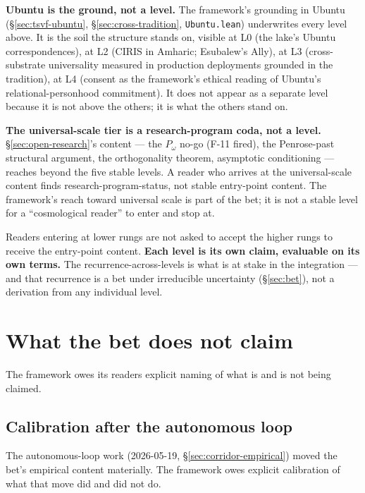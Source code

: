 \documentclass[11pt,a4paper]{article}
\newcommand{\Pomega}{P_{\omega}}
\begin{document}
\textbf{Ubuntu is the ground, not a level.} The framework's grounding in Ubuntu (\S\ref{sec:tsvf-ubuntu}, \S\ref{sec:cross-tradition}, \texttt{Ubuntu.lean}) underwrites every level above. It is the soil the structure stands on, visible at L0 (the lake's Ubuntu correspondences), at L2 (CIRIS in Amharic; Esubalew's Ally), at L3 (cross-substrate universality measured in production deployments grounded in the tradition), at L4 (consent as the framework's ethical reading of Ubuntu's relational-personhood commitment). It does not appear as a separate level because it is not above the others; it is what the others stand on.

\textbf{The universal-scale tier is a research-program coda, not a level.} \S\ref{sec:open-research}'s content --- the $\Pomega$ no-go (F-11 fired), the Penrose-past structural argument, the orthogonality theorem, asymptotic conditioning --- reaches beyond the five stable levels. A reader who arrives at the universal-scale content finds research-program-status, not stable entry-point content. The framework's reach toward universal scale is part of the bet; it is not a stable level for a ``cosmological reader'' to enter and stop at.

Readers entering at lower rungs are not asked to accept the higher rungs to receive the entry-point content. \textbf{Each level is its own claim, evaluable on its own terms.} The recurrence-across-levels is what is at stake in the integration --- and that recurrence is a bet under irreducible uncertainty (\S\ref{sec:bet}), not a derivation from any individual level.

\section{What the bet does not claim}\label{sec:not-claim}

The framework owes its readers explicit naming of what is and is not being claimed.

\subsection*{Calibration after the autonomous loop}

The autonomous-loop work (2026-05-19, \S\ref{sec:corridor-empirical}) moved the bet's empirical content materially. The framework owes explicit calibration of what that move did and did not do.
\end{document}
